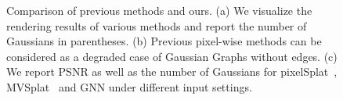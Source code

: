 \begin{figure}[t]
  \centering
  \vspace{-0.2cm}
  \begin{minipage}[h]{0.99\linewidth}
      \centering            
  \end{minipage}
  \caption{Comparison of previous methods and ours. (a) We visualize the rendering results of various methods and report the number of Gaussians in parentheses. (b) Previous pixel-wise methods can be considered as a degraded case of Gaussian Graphs without edges. (c) We report PSNR as well as the number of Gaussians for pixelSplat~\cite{pixelSplat2023arXiv}, MVSplat~\cite{MVSplat2024arXiv} and GNN under different input settings.}
  \label{fig:teaser}
  \vspace{-0.2cm}
\end{figure}
    
